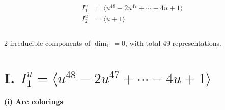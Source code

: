 \documentclass[1p]{elsarticle_modified}
\theoremstyle{definition}
\begin{document}
\begin{align*}
I^u_{1}&=\langle 
u^{48}-2 u^{47}+\cdots-4 u+1\rangle \\
I^u_{2}&=\langle 
u+1\rangle \\
\\
\end{align*}
\raggedright * 2 irreducible components of $\dim_{\mathbb{C}}=0$, with total 49 representations.\\
\newpage
\renewcommand{\arraystretch}{1}
\centering \section*{I. $I^u_{1}= \langle u^{48}-2 u^{47}+\cdots-4 u+1 \rangle$}
\flushleft \textbf{(i) Arc colorings}\\
\end{document}
